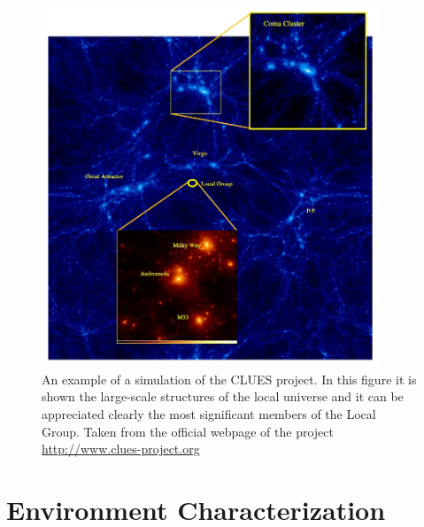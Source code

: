 \begin{figure}[htbp]
	\centering
	\includegraphics[width=0.90\textwidth]
	{./figures/3_nbody_simulations/CLUES_Overview.png}

	\caption{\small{An example of a simulation of the CLUES project. In 
	this figure it is shown the large-scale structures of the local 
	universe and it can be appreciated clearly the most significant members
	of the Local Group. Taken from the official webpage of the project
	\url{http://www.clues-project.org}}}
	
	\label{fig:CLUES_Overview}
\end{figure}






\section{Environment Characterization}
\label{sec:EnvironmentCharacterization}


